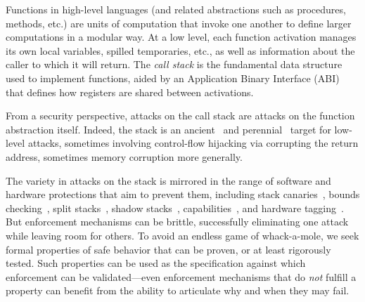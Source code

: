 \documentclass[10pt,conference]{ieeetran}%
\theoremstyle{definition}
\begin{document}

Functions in high-level languages (and related abstractions such
as procedures, methods, etc.) are units of computation
that invoke one another to define larger computations in a modular way.
%
At a low level, each function activation manages its own local
variables, spilled temporaries, etc., as well as information about the
{caller} to which it will return.
%
The \emph{call stack} is the fundamental data structure used to
implement functions, aided by an Application Binary Interface (ABI)
that defines how registers are shared between activations.

From a security perspective, attacks on the call stack
are attacks on the function abstraction itself.
%
Indeed, the stack is an ancient~\cite{phrack96:smashingthestack} and
perennial~\cite{mitre-cwe,DBLP:conf/raid/VeendCB12,
  DBLP:conf/sp/SzekeresPWS13,
  DBLP:conf/sp/HuSACSL16,msrc-bluehat,chromium-security}
target for low-level attacks, sometimes involving control-flow
hijacking via corrupting the return address, sometimes memory corruption
more generally.
%
%

The variety in attacks on the stack is mirrored in the range of
software and hardware protections that aim to prevent them,
%
including stack canaries~\cite{Cowan+98},
bounds checking~\cite{NagarakatteZMZ09,NagarakatteZMZ10,DeviettiBMZ08},
split stacks~\cite{Kuznetsov+14},
shadow stacks~\cite{Dang+15,Shanbhogue+19},
capabilities~\cite{Woodruff+14,Chisnall+15,SkorstengaardLocal,SkorstengaardSTKJFP,Georges22:TempsDesCerises},
and hardware tagging~\cite{DBLP:conf/sp/RoesslerD18,Gollapudi+23}.
%
But enforcement mechanisms can be brittle, successfully eliminating one
attack while leaving room for others. To avoid an endless game of
whack-a-mole, we seek formal properties of safe behavior that can be
proven, or at least rigorously tested. Such properties can be used as
the specification against which enforcement can be validated---even
enforcement mechanisms that do {\em not} fulfill a property can benefit from the
ability to articulate why and when they may fail.
\end{document}

